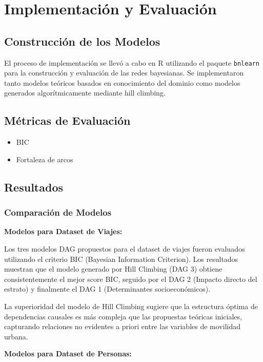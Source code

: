 \documentclass[12pt,a4paper]{article}
\begin{document}
\section{Implementación y Evaluación}

\subsection{Construcción de los Modelos}

El proceso de implementación se llevó a cabo en R utilizando el paquete \texttt{bnlearn} para la construcción y evaluación de las redes bayesianas. Se implementaron tanto modelos teóricos basados en conocimiento del dominio como modelos generados algorítmicamente mediante hill climbing.

\subsection{Métricas de Evaluación}

\begin{itemize}
    \item BIC
    \item Fortaleza de arcos
\end{itemize}

\subsection{Resultados}

\subsubsection{Comparación de Modelos}

\textbf{Modelos para Dataset de Viajes:}

Los tres modelos DAG propuestos para el dataset de viajes fueron evaluados utilizando el criterio BIC (Bayesian Information Criterion). Los resultados muestran que el modelo generado por Hill Climbing (DAG 3) obtiene consistentemente el mejor score BIC, seguido por el DAG 2 (Impacto directo del estrato) y finalmente el DAG 1 (Determinantes socioeconómicos).

La superioridad del modelo de Hill Climbing sugiere que la estructura óptima de dependencias causales es más compleja que las propuestas teóricas iniciales, capturando relaciones no evidentes a priori entre las variables de movilidad urbana.

\textbf{Modelos para Dataset de Personas:}
\end{document}
